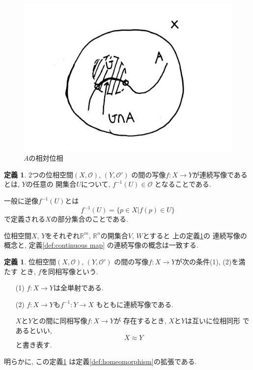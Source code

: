 \documentclass[a4j,12pt]{jarticle}
\theoremstyle{definition}
\newtheorem{definition}[theorem]{定義}
\begin{document}
\begin{figure}[H]
    \centering
    \includegraphics[keepaspectratio, scale=0.3]{relativeTopology.pdf}
    \caption{$A$の相対位相}
    \label{relativeTopology}
   \end{figure}
   
\begin{definition}\label{def:topological continuous map}
$2$つの位相空間$(X, \mathcal{O})$, $(Y,\mathcal{O}')$
の間の写像$f:X\to Y$が連続写像であるとは, $Y$の任意の
開集合$U$について, $f^{-1}(U)\in \mathcal{O}$
となることである. 

一般に逆像$f^{-1}(U)$とは
$$f^{-1}(U)=\{p\in X|f(p)\in U\}$$
で定義される$X$の部分集合のことである. 
\end{definition}
位相空間$X$, $Y$をそれぞれ$\mathbb{R}^m$, 
$\mathbb{R}^n$の開集合$V$, $W$とすると
上の定義\ref{def:topological continuous map}の
連続写像の概念と, 定義\ref{def:continuous map}
の連続写像の概念は一致する. 
\begin{definition}\label{def:topological homeomorphism}
    位相空間$(X,\mathcal{O})$, $(Y,\mathcal{O}')$
    の間の写像$f:X\to Y$が次の条件(1), (2)を満たす
    とき, $f$を同相写像という. 
    \begin{itemize}
        \item[(1)]$f:X\to Y$は全単射である. 
        \item[(2)]$f:X\to Y$も$f^{-1}:Y\to X$
        もともに連続写像である. 

        $X$と$Y$との間に同相写像$f:X\to Y$が
    存在するとき, $X$と$Y$は互いに位相同形
    であるといい, 
    $$X \approx Y$$
    と書き表す. 
    \end{itemize}
\end{definition}
明らかに, この定義\ref{def:topological homeomorphism}
は定義\ref{def:homeomorphism}の拡張である. 
\end{document}

